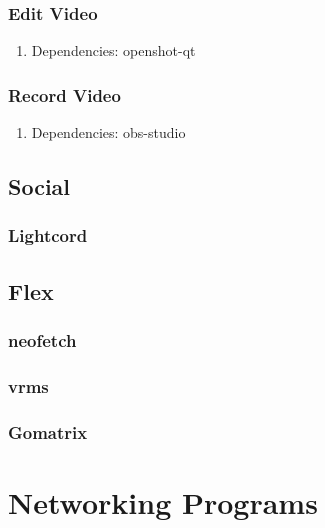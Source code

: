 \documentclass[10pt, a4paper, onecolumn, openany]{book} %
\begin{document}
\subsection{Edit Video}
\begin{enumerate}
    \item Dependencies: openshot-qt
\end{enumerate}
\subsection{Record Video}
\begin{enumerate}
    \item Dependencies: obs-studio
\end{enumerate}
\section{Social}
\subsection{Lightcord}
\section{Flex}
\subsection{neofetch}
\subsection{vrms}
\subsection{Gomatrix}



\chapter{Networking Programs}
\end{document}
